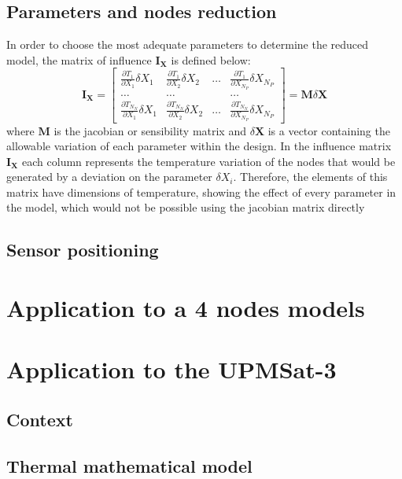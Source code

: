 \section{Parameters and nodes reduction}
In order to choose the most adequate parameters to determine the reduced model, the matrix of influence $\mathbf{I}_{\mathbf{X}}$ is defined below:
\begin{equation}
\mathbf{I}_{\mathbf{X}}=\left[\begin{array}{cccc}
\frac{\partial T_1}{\partial X_1} \delta X_1 & \frac{\partial T_1}{\partial X_2} \delta X_2 & \ldots & \frac{\partial T_1}{\partial X_{N_P}} \delta X_{N_P} \\
\ldots & \ldots & & \ldots \\
\frac{\partial T_{N_N}}{\partial X_1} \delta X_1 & \frac{\partial T_{N_N}}{\partial X_2} \delta X_2 & \ldots & \frac{\partial T_{N_N}}{\partial X_{N_P}} \delta X_{N_P}
\end{array}\right]=\mathbf{M} \delta \boldsymbol{X}
\end{equation}
where $\mathbf{M}$ is the jacobian or sensibility matrix and $ \delta \boldsymbol{X}$ is a vector containing the allowable variation of each parameter within the design. In the influence matrix $\mathbf{I}_{\mathbf{X}}$ each column represents the temperature variation of the nodes that would be generated by a deviation on the parameter $ \delta X_i$. Therefore, the elements of this matrix have dimensions of temperature, showing the effect of every parameter in the model, which would not be possible using the jacobian matrix directly
\section{Sensor positioning} 


\chapter{Application to a 4 nodes models}
\chapter{Application to the UPMSat-3}
\section{Context}
\section{Thermal mathematical model}
